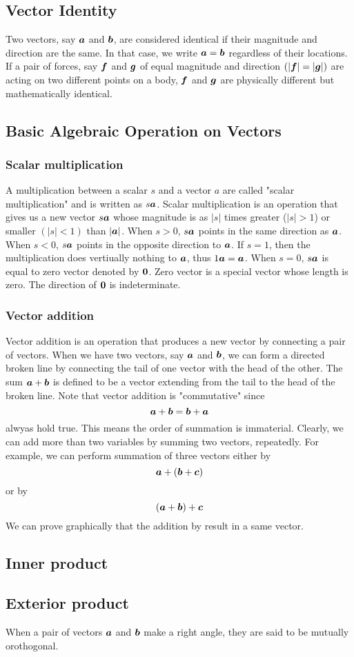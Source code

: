 \documentclass[10pt,a4j]{jarticle}
\begin{document}
\subsection{Vector Identity}
Two vectors, say $\mbox{\boldmath $a$}$ and $\mbox{\boldmath $b$}$, are considered identical 
if their magnitude and direction are the same. 
In that case, we write $\mbox{\boldmath $a$}=\mbox{\boldmath $b$}$ regardless of their locations. 
If a pair of forces, say $\mbox{\boldmath $f$}$ and $\mbox{\boldmath $g$}$ of equal magnitude and 
direction $(|\mbox{\boldmath $f$}|=|\mbox{\boldmath $g$}|)$ are acting on two different points 
on a body, $\mbox{\boldmath $f$}$ and $\mbox{\boldmath $g$}$ are physically different but 
mathematically identical. 
\subsection{Basic Algebraic Operation on Vectors}
\subsubsection{Scalar multiplication}
A multiplication between a scalar $s$ and a vector $a$ are called 
"scalar multiplication" and is written as $s\mbox{\boldmath $a$}$. 
Scalar multiplication is an operation that gives us a new vector $s\mbox{\boldmath $a$}$ 
whose magnitude is as $|s|$ times greater ($|s|>1$) or smaller $(|s|<1)$ than 
$|\mbox{\boldmath $a$}|$.
When $s>0$, $s\mbox{\boldmath $a$}$ points in the same direction as $\mbox{\boldmath $a$}$. 
When $s<0$, $s\mbox{\boldmath $a$}$ points in the opposite direction to $\mbox{\boldmath $a$}$. 
If $s=1$, then the multiplication does vertiually nothing to $\mbox{\boldmath $a$}$, thus 
$1\mbox{\boldmath $a$}=\mbox{\boldmath $a$}$. When $s=0$, $s\mbox{\boldmath $a$}$ is equal to zero vector denoted by $\mbox{\boldmath $0$}$. 
Zero vector is a special vector whose length is zero. 
The direction of $\mbox{\boldmath $0$}$ is indeterminate. 
\subsubsection{Vector addition}
Vector addition is an operation that produces a new vector by connecting 
a pair of vectors. 
When we have two vectors, say $\mbox{\boldmath $a$}$ and $\mbox{\boldmath $b$}$, 
we can form a directed broken line by connecting the tail of one vector with 
the head of the other. The sum $\mbox{\boldmath $a$}+\mbox{\boldmath $b$}$ is defined to be a vector 
extending from the tail to the head of the broken line.
Note that vector addition is "commutative" since 
\[
	\mbox{\boldmath $a$}+\mbox{\boldmath $b$}=\mbox{\boldmath $b$}+\mbox{\boldmath $a$}
\]
alwyas hold true. This means the order of summation is immaterial. 
Clearly, we can add more than two variables by summing two vectors, repeatedly. 
For example, we can perform summation of three vectors either by 
\[
	\mbox{\boldmath $a$}+\left( \mbox{\boldmath $b$}+\mbox{\boldmath $c$} \right)
\]
or by 
\[
	\left( \mbox{\boldmath $a$}+\mbox{\boldmath $b$} \right) + \mbox{\boldmath $c$}
\]
We can prove graphically that the addition by result in a same vector. 
\subsection{Inner product} 
\subsection{Exterior product} 
When a pair of vectors $\mbox{\boldmath $a$}$ and $\mbox{\boldmath $b$}$ make a right 
angle, they are said to be mutually orothogonal.  
\end{document}
